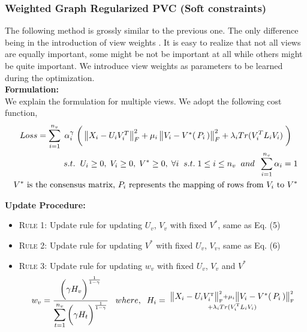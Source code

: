 \documentclass[a4paper]{article}
\begin{document}
	\subsubsection{Weighted Graph Regularized PVC (Soft constraints)}
	
	The following method is grossly similar to the previous one. The only difference being in the introduction of view weights \cite{cai2013multi}. It is easy to realize that not all views are equally important, some might be not be important at all while others might be quite important. We introduce view weights as parameters to be learned during the optimization.\\	
	
	\noindent	
	\textbf{Formulation:}\\
	We explain the formulation for multiple views. We adopt the following cost function,
	\begin{multline}
	Loss = \displaystyle\sum_{i=1}^{n_{v}} \; \alpha_{i}^{\gamma} \; 
		\bigg(\begin{Vmatrix} X_{i}-U_{i}V^{T}_{i} \end{Vmatrix}^{2}_{F}	
		+ \mu_{i}\begin{Vmatrix} V_{i}-V^{*}(\, P_{i} \, ) \end{Vmatrix}^{2}_{F}
		+ \lambda_{i}Tr(V^{T}_{i}L_{i}V_{i}) \; \bigg) \\	
		\hfill s.t. \hspace{2mm}  U_{i}\geq0,\;V_{i}\geq0,\;V^{*}\geq0,\;\forall i \;\;s.t.\; 1 \leq i \leq n_{v}
		\;\; and \;\; \sum_{i=1}^{n_{v}} \alpha_{i} = 1 \\
		\hfill V^{*} \text{ is the consensus matrix, }
		P_{i} \text{ represents the mapping of rows from } V_{i} \text{ to } V^{*}
	\end{multline}
	
	\noindent
	\textbf{Update Procedure:}
	\begin{itemize}
		\item \textsc{Rule 1:}	Update rule for updating $U_{v}$, ${V_{v}}$ with fixed $V^{*}$, same as Eq. (5)
		\item \textsc{Rule 2:}	Update rule for updating $V^{*}$ with fixed $U_{v}$, ${V_{v}}$, same as Eq. (6) 
		\item \textsc{Rule 3:}	Update rule for updating $w_{v}$ with fixed $U_{v}$, ${V_{v}}$ and $V^{*}$ 
			\begin{multline}
			w_{v} = \frac{ \bigg( \gamma H_{v} \bigg)^{\frac{1}{1-\gamma}}}
			{\displaystyle \sum_{t=1}^{n_{v}}
			\bigg( \gamma H_{t} \bigg)^{\frac{1}{1-\gamma}}} \;\;\;
			where, \;\; H_{i} = \; \substack { \begin{Vmatrix} X_{i}-U_{i}V^{\text{\tiny{T}}}_{i}
			 \end{Vmatrix}^{\text{\tiny{2}}}_{\text{\tiny{F}}} + \mu_{i}\begin{Vmatrix} V_{i}-V^{*}(\, P_{i} \, ) 
			 \end{Vmatrix}^{\text{\tiny{2}}}_{\text{\tiny{F}}} \\
			+ \lambda_{i}Tr(V^{\text{\tiny{T}}}_{i}L_{i}V_{i}) }\\
			\end{multline}
	\end{itemize}		
	
\end{document}
